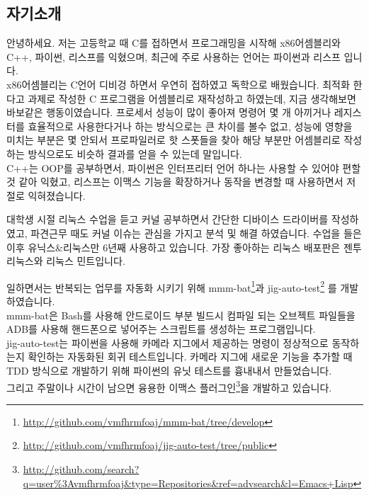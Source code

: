 \documentclass[line,margin]{res}
\begin{document}
\address{H.P: 010-8633-9775}
\address{E-mail: vmfhrmfoaj@yahoo.com}


\begin{resume}

  \section{자기소개}


  안녕하세요.
  저는 고등학교 때 C를 접하면서 프로그래밍을 시작해 x86어셈블리와 C++, 파이썬, 리스프를 익혔으며,
  최근에 주로 사용하는 언어는 파이썬과 리스프 입니다. \\
  x86어셈블리는 C언어 디비겅 하면서 우연히 접하였고 독학으로 배웠습니다.
  최적화 한다고 과제로 작성한 C 프로그램을 어셈블리로 재작성하고 하였는데, 지금 생각해보면 바보같은 행동이였습니다.
  프로세서 성능이 많이 좋아져 명령어 몇 개 아끼거나 레지스터를 효율적으로 사용한다거나 하는 방식으로는 큰 차이를 볼수 없고,
  성능에 영향을 미치는 부분은 몇 안되서 프로파일러로 핫 스폿들을 찾아 해당 부분만 어셈블리로 작성하는 방식으로도 비슷하 결과를 얻을 수 있는데 말입니다. \\
  C++는 OOP를 공부하면서, 파이썬은 인터프리터 언어 하나는 사용할 수 있어야 편할 것 같아 익혔고,
  리스프는 이맥스 기능을 확장하거나 동작을 변경할 때 사용하면서 저절로 익혀졌습니다.

  대학생 시절 리눅스 수업을 듣고 커널 공부하면서 간단한 디바이스 드라이버를 작성하였고,
  파견근무 때도 커널 이슈는 관심을 가지고 분석 및 해결 하였습니다.
  수업을 들은 이후 유닉스\&리눅스만 6년째 사용하고 있습니다.
  가장 좋아하는 리눅스 배포판은 젠투 리눅스와 리눅스 민트입니다.

  일하면서는 반복되는 업무를 자동화 시키기 위해 mmm-bat\footnote{
    \href{{http://github.com/vmfhrmfoaj/mmm-bat/tree/develop}}
    {http://github.com/vmfhrmfoaj/mmm-bat/tree/develop}}과
  jig-auto-test\footnote{
    \href{{http://github.com/vmfhrmfoaj/jig-auto-test/tree/public}}
    {http://github.com/vmfhrmfoaj/jig-auto-test/tree/public}}
  를 개발하였습니다. \\
  mmm-bat은 Bash를 사용해 안드로이드 부분 빌드시 컴파일 되는 오브젝트 파일들을
  ADB를 사용해 핸드폰으로 넣어주는 스크립트를 생성하는 프로그램입니다. \\
  jig-auto-test는 파이썬을 사용해 카메라 지그에서 제공하는 명령이 정상적으로 동작하는지 확인하는 자동화된 회귀 테스트입니다.
  카메라 지그에 새로운 기능을 추가할 때 TDD 방식으로 개발하기 위해 파이썬의 유닛 테스트를 흉내내서 만들었습니다. \\
  그리고 주말이나 시간이 남으면 융용한 이맥스 플러그인\footnote{
    \href{http://github.com/search?q=user\%3Avmfhrmfoaj\&type=Repositories\&ref=advsearch\&l=Emacs+Lisp}
    {http://github.com/search?q=user\%3Avmfhrmfoaj\&type=Repositories\&ref=advsearch\&l=Emacs+Lisp}}을
  개발하고 있습니다.


\end{resume}
\end{document}
